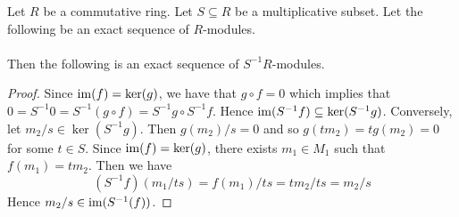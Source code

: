 \documentclass[a4paper]{article}
\begin{document}
\begin{prp}{}{} Let $R$ be a commutative ring. Let $S\subseteq R$ be a multiplicative subset. Let the following be an exact sequence of $R$-modules. \\
\\
Then the following is an exact sequence of $S^{-1}R$-modules. \\
\begin{proof}
Since $\operatorname{im}(f)=\ker(g)$, we have that $g\circ f=0$ which implies that $0=S^{-1}0=S^{-1}(g\circ f)=S^{-1}g\circ S^{-1}f$. Hence $\operatorname{im}(S^{-1}f)\subseteq\ker(S^{-1}g)$. Conversely, let $m_2/s\in\ker(S^{-1}g)$. Then $g(m_2)/s=0$ and so $g(tm_2)=tg(m_2)=0$ for some $t\in S$. Since $\operatorname{im}(f)=\ker(g)$, there exists $m_1\in M_1$ such that $f(m_1)=tm_2$. Then we have $$(S^{-1}f)(m_1/ts)=f(m_1)/ts=tm_2/ts=m_2/s$$ Hence $m_2/s\in\operatorname{im}(S^{-1}(f))$. 
\end{proof}
\end{prp}
\end{document}
